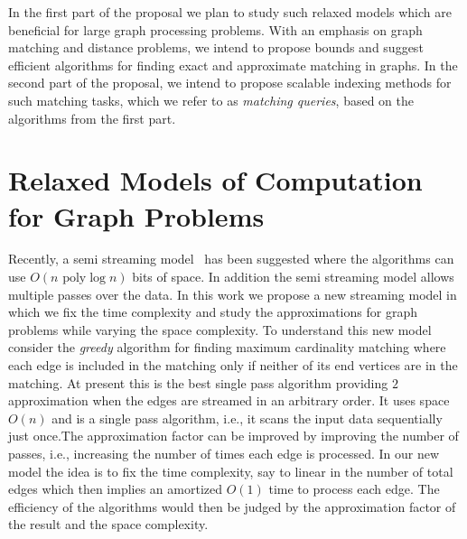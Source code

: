 \documentclass{scrartcl}
\begin{document}
In the first part of the proposal we plan to study such relaxed models which are beneficial for large graph processing problems. With an emphasis on graph matching and distance problems, we intend to propose bounds and suggest efficient algorithms for finding exact and approximate matching in graphs. In the second part of the proposal, we intend to propose scalable indexing methods for such matching tasks, which we refer to as \emph{matching queries}, based on the algorithms from the first part.

\section{Relaxed Models of Computation for Graph Problems}
%

Recently, a semi streaming model~\cite{Muthukrishnan03} has been suggested where the algorithms can use $O(n \text{ poly} \log n)$ bits of space. In addition the semi streaming model allows multiple passes over the data.  In this work we propose a new streaming model in which we fix the time complexity and study the approximations for graph problems while varying the space complexity. To understand this new model consider the \emph{greedy} algorithm for finding maximum cardinality matching where each edge is included in the matching only if neither of its end vertices are in the matching. At present this is the best single pass algorithm providing $2$ approximation when the edges are streamed in an arbitrary order. It uses space $O(n)$ and is a single pass algorithm, i.e., it scans the input data sequentially just once.The approximation factor can be improved by improving the number of passes, i.e., increasing the number of times each edge is processed. In our new model the idea is to fix the time complexity, say to linear in the number of total edges which then implies an amortized $O(1)$ time to process each edge. The efficiency of the algorithms would then be judged by the approximation factor of the result and the space complexity.  
\end{document}
